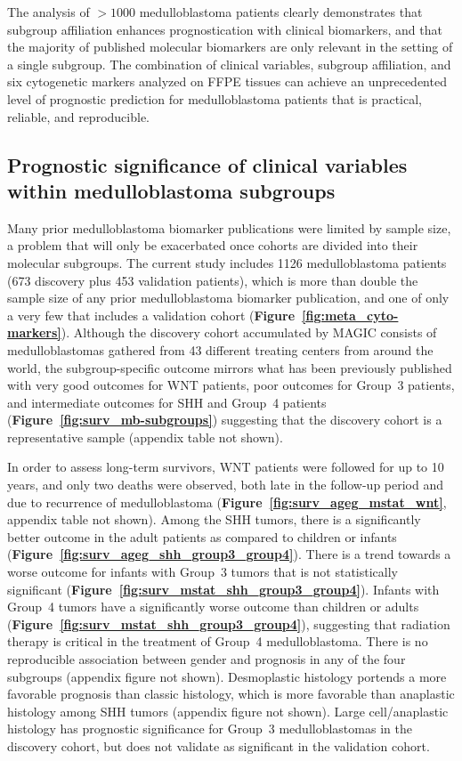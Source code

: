 \documentclass[11pt,letterpaper]{article}
\theoremstyle{definition}
\newcommand{\citefig}[1]{\textbf{Figure~\ref{fig:#1}}}
\begin{document}
The analysis of $> 1000$ medulloblastoma patients clearly demonstrates that subgroup affiliation enhances prognostication with clinical biomarkers, and that the majority of published molecular biomarkers are only relevant in the setting of a single subgroup. The combination of clinical variables, subgroup affiliation, and six cytogenetic markers analyzed on FFPE tissues can achieve an unprecedented level of prognostic prediction for medulloblastoma patients that is practical, reliable, and reproducible.

\subsection{Prognostic significance of clinical variables within medulloblastoma subgroups}

Many prior medulloblastoma biomarker publications were limited by sample size, a problem that will only be exacerbated once cohorts are divided into their molecular subgroups.  The current study includes 1126 medulloblastoma patients (673 discovery plus 453 validation patients), which is more than double the sample size of any prior medulloblastoma biomarker publication, and one of only a very few that includes a validation cohort (\citefig{meta_cyto-markers}). Although the discovery cohort accumulated by MAGIC consists of medulloblastomas gathered from 43 different treating centers from around the world, the subgroup-specific outcome mirrors what has been previously published with very good outcomes for WNT patients, poor outcomes for Group~3 patients, and intermediate outcomes for SHH and Group~4 patients (\citefig{surv_mb-subgroups}) suggesting that the discovery cohort is a representative sample (appendix table not shown).

In order to assess long-term survivors, WNT patients were followed for up to 10 years, and only two deaths were observed, both late in the follow-up period and due to recurrence of medulloblastoma (\citefig{surv_ageg_mstat_wnt}, appendix table not shown).  Among the SHH tumors, there is a significantly better outcome in the adult patients as compared to children or infants (\citefig{surv_ageg_shh_group3_group4}).  There is a trend towards a worse outcome for infants with Group~3 tumors that is not statistically significant (\citefig{surv_mstat_shh_group3_group4}).  Infants with Group~4 tumors have a significantly worse outcome than children or adults (\citefig{surv_mstat_shh_group3_group4}), suggesting that radiation therapy is critical in the treatment of Group~4 medulloblastoma. There is no reproducible association between gender and prognosis in any of the four subgroups (appendix figure not shown). Desmoplastic histology portends a more favorable prognosis than classic histology, which is more favorable than anaplastic histology among SHH tumors (appendix figure not shown). Large cell/anaplastic histology has prognostic significance for Group~3 medulloblastomas in the discovery cohort, but does not validate as significant in the validation cohort.
\end{document}
